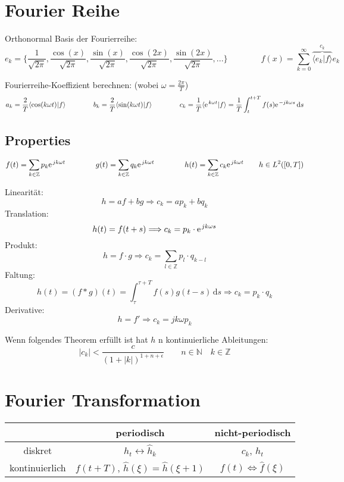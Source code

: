 \section{Fourier Reihe}

Orthonormal Basis der Fourierreihe:
\[  
	e_k=\{\frac{1}{\sqrt{2 \pi}}, \frac{\cos(x)}{\sqrt{2 \pi}}, \frac{\sin(x)}{\sqrt{2 \pi}}, \frac{\cos(2x)}{\sqrt{2 \pi}}, \frac{\sin(2x)}{\sqrt{2 \pi}}, ... \} 
	\qquad \qquad
	f(x) = \sum_{k=0}^{\infty}\overbrace{\langle e_k|f \rangle}^{c_k} e_k
\]

Fourierreihe-Koeffizient berechnen: (wobei $\omega = \frac{2\pi}{T}$)
\[ 	a_k = \frac{2}{T} \langle \cos(k\omega t)|f \rangle 
	\qquad \qquad 
	b_k = \frac{2}{T} \langle \sin(k\omega t)|f \rangle 
	\qquad \qquad
	c_k = \frac{1}{T} \langle \e^{k\omega t}|f \rangle = \frac{1}{T} \int_{t}^{t+T}f(s) \e^{-jk\omega s} \, \mathrm{d}s
\]

\subsection{Properties}
\[  
	f(t) = \sum_{k \in \mathbb{Z}} p_k \e^{jk\omega t} \qquad \qquad g(t) = \sum_{k \in \mathbb{Z}} q_k \e^{jk\omega t} \qquad \qquad h(t) = \sum_{k \in \mathbb{Z}} c_k \e^{jk\omega t} \qquad h \in L^2([0,T])
\]

Linearität:\[ h=af+bg \Longrightarrow c_k=ap_k+bq_k \]
Translation:\[ h(t)=f(t+s) \Longrightarrow c_k=p_k\cdot \e^{jk\omega s} \]
Produkt:\[ h=f\cdot g \Longrightarrow c_k=\sum_{l\in\mathbb{Z}}p_l\cdot q_{k-l} \]
Faltung:\[ h(t)=(f\ast g)(t)=\int_{\tau}^{\tau + T}f(s)g(t-s) \, \mathrm{d}s \Longrightarrow c_k=p_k \cdot q_k \]
Derivative:\[ h=f' \Longrightarrow c_k=jk\omega p_k \]

Wenn folgendes Theorem erfüllt ist hat $h$ n kontinuierliche Ableitungen:
\[ |c_k|<\dfrac{c}{(1+|k|)^{1+n+\epsilon}} \qquad n \in \mathbb{N} \quad k \in \mathbb{Z} \]



\newpage
\section{Fourier Transformation}
\begin{center}
	\begin{tabular}{c|c|c}
		& periodisch & nicht-periodisch \\
		\hline
		diskret & $h_t \leftrightarrow \hat{h}_k$ & $c_k$, $h_t$ \\
		\hline
		kontinuierlich & $f(t+T)$, $\hat{h}(\xi)=\hat{h}(\xi + 1)$ & $f(t)\Leftrightarrow \hat{f}(\xi)$
	\end{tabular}
\end{center}

